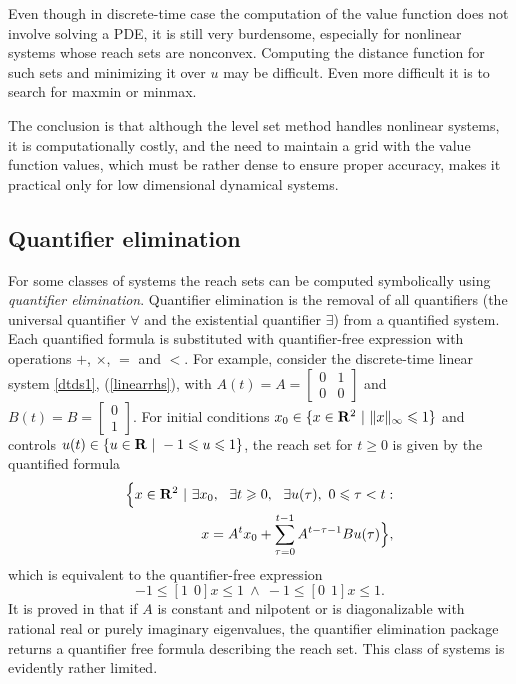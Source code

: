 Even though in discrete-time case the computation of the value function
does not involve solving a PDE, it is still very burdensome, especially
for nonlinear systems whose reach sets are nonconvex.
Computing the distance function for such sets and minimizing it over $u$ may be
difficult.
Even more difficult it is to search for maxmin or minmax.

The conclusion is that although the level set method handles nonlinear
systems, it is computationally costly,
and the need to maintain a grid with the value function values, which
must be rather dense to ensure proper accuracy, makes it practical
only for low dimensional dynamical systems.

















\subsection{Quantifier elimination}\label{subsec_quantifiers}
For some classes of systems the reach sets can be computed symbolically
using \emph{quantifier elimination}.
Quantifier elimination is the removal of all quantifiers (the universal
quantifier $\forall$ and the existential quantifier $\exists$)
from a quantified system.
Each quantified formula is substituted with quantifier-free expression
with operations $+$, $\times$, $=$ and $<$.
For example,
consider the discrete-time linear system \ref{dtds1}, (\ref{linearrhs}),
with $A(t)=A=\left[\begin{array}{cc}
0 & 1\\
0 & 0\end{array}\right]$ and $B(t)=B=\left[\begin{array}{c}
0\\
1\end{array}\right]$.
For initial conditions $x_0\in\{x\in {\bf R}^2 ~|~ \|x\|_{\infty} \leq 1\}$
and controls $u(t)\in\{u\in {\bf R} ~|~ -1\leq u\leq1\}$,
the reach set for  $t\geq0$ is given by the quantified formula
\begin{eqnarray*}
\Big{\{} x\in{\bf R}^2 ~|~ \exists x_0, ~~ \exists t\geq 0, ~~
\exists u(\tau), ~ 0\leq\tau<t: \\
x = A^tx_0+\sum_{\tau=0}^{t-1}A^{t-\tau-1}Bu(\tau) \Big{\}},
\end{eqnarray*}
which is equivalent to the quantifier-free expression
\[ -1\leq[1 ~~ 0]x\leq1 ~ \wedge ~ -1\leq[0 ~~ 1]x\leq1. \]
It is proved in \cite{yovine01} that if $A$ is constant and nilpotent or
is diagonalizable with rational real or purely imaginary eigenvalues,
the quantifier elimination package returns a quantifier free formula
describing the reach set.
This class of systems is evidently rather limited.

